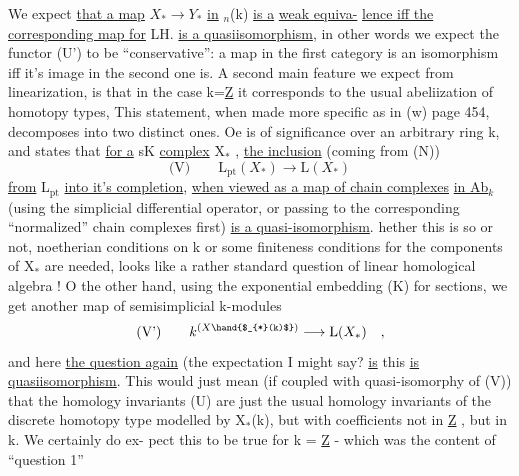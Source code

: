 We expect \uline{that a map} $X_{*} \longrightarrow Y_{*}$ \uline{in} $_n$(k) \uline{is a}  \uline{weak equiva-}%
\uline{lence iff the corresponding map for} LH. \uline{is a quasiisomorphism}, in other
words we expect the functor (U') to be ``conservative'': a map in the
first category is an isomorphism iff it's image in the second one is.
A second main feature we expect from linearization, is that in the case
k=\underline{Z} it corresponds to the usual abeliization of homotopy types, This
statement, when made more specific as in (w) page 454, decomposes into
two distinct ones. Oe is of significance over an arbitrary ring k,
and states that \uline{for a} sK \uline{complex} X$_{*}$ , \uline{the inclusion} (coming from (N))
\[ \text{(V)} \qquad \mathrm{L}_{\mathrm{pt}}(X_{*}) \longrightarrow \mathrm{L}(X_{*}) \] 
\uline{from} L$_{\mathrm{pt}}$ \uline{into it's completion}, \uline{when viewed as a map of chain complexes}
\uline{in Ab$_k$} (using the simplicial differential operator, or passing to the
corresponding ``normalized'' chain complexes first) \uline{is a quasi-isomorphism}.
hether this is  so or not,    noetherian conditions on k or some 
finiteness conditions for the components of X$_{*}$ are needed, looks like a
rather standard question of linear homological algebra ! O the other
hand, using the exponential embedding (K) for sections, we get another
map  of semisimplicial k-modules
\[ \text{(V')} \qquad k^{(X\hand{$_{*}(k)$})} \longrightarrow \mathrm{L}(X_{*}) \quad , \] 
and here \uline{the question again} (the expectation I might say?\hand{)} \uline{is}   this
\uline{is   quasiisomorphism}. This would just mean  (if coupled with
quasi-isomorphy of (V)) that the homology invariants (U) are just the
usual homology invariants of the discrete homotopy type modelled by
X$_{*}$(k), but with coefficients not in \underline{Z} , but in k. We certainly do ex-%
pect this to be true for k = \underline{Z} - which was the content of ``question 1''

